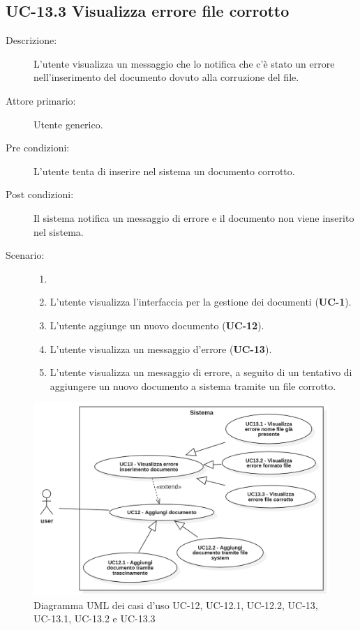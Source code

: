 \subsection{UC-13.3 Visualizza errore file corrotto}
\begin{description}
    \item[Descrizione:] L'utente visualizza un messaggio che lo notifica che c'è stato un errore nell'inserimento del documento dovuto alla corruzione del file.
    \item[Attore primario:] Utente generico.
    \item[Pre condizioni:] L'utente tenta di inserire nel sistema un documento corrotto.
    \item[Post condizioni:] Il sistema notifica un messaggio di errore e il documento non viene inserito nel sistema.
    \item[Scenario:]
    \begin{enumerate}
        \item[] 
        \item L’utente visualizza l'interfaccia per la gestione dei documenti (\textbf{UC-1}).
        \item L’utente aggiunge un nuovo documento (\textbf{UC-12}).
        \item L'utente visualizza un messaggio d'errore (\textbf{UC-13}).
        \item L'utente visualizza un messaggio di errore, a seguito di un tentativo di aggiungere un nuovo documento a sistema tramite un file corrotto.
    \end{enumerate}
\end{description}

\begin{figure}[H]
    \centering
    \includegraphics[width=\linewidth]{UC12-13.PNG}
    \caption{Diagramma UML dei casi d'uso UC-12, UC-12.1, UC-12.2, UC-13, UC-13.1, UC-13.2 e UC-13.3}
    \label{fig:UC12-13}
\end{figure}

